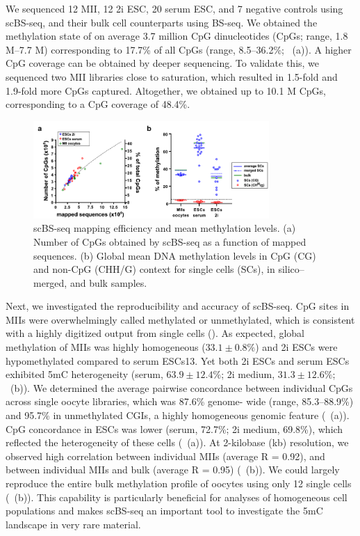 We sequenced 12 MII, 12 2i ESC, 20 serum ESC, and 7 negative controls using scBS-seq, and their bulk cell counterparts using BS-seq. We obtained the methylation state of on average 3.7 million CpG dinucleotides (CpGs; range, 1.8 M–7.7 M) corresponding to 17.7\% of all CpGs (range, 8.5–36.2\%; ~(a)). A higher CpG coverage can be obtained by deeper sequencing. To validate this, we sequenced two MII libraries close to saturation, which resulted in 1.5-fold and 1.9-fold more CpGs captured. Altogether, we obtained up to 10.1 M CpGs, corresponding to a CpG coverage of 48.4\%.

\begin{figure}[htbp!]
\centering
\includegraphics[width=0.8\textwidth]{qc}
\caption[scBS-seq mapping efficiency and mean methylation levels.]{scBS-seq mapping efficiency and mean methylation levels. (a) Number of CpGs obtained by scBS-seq as a function of mapped sequences. (b) Global mean DNA methylation levels in CpG (CG) and non-CpG (CHH/G) context for single cells (SCs), in silico–merged, and bulk samples. }
\label{fig:bs_qc}
\end{figure}

Next, we investigated the reproducibility and accuracy of scBS-seq. CpG sites in MIIs were overwhelmingly called methylated or unmethylated, which is consistent with a highly digitized output from single cells (). As expected, global methylation of MIIs was highly homogeneous ($33.1 \pm 0.8\%$) and 2i ESCs were hypomethylated compared to serum ESCs13. Yet both 2i ESCs and serum ESCs exhibited 5mC heterogeneity (serum, $63.9 \pm 12.4\%$; 2i medium, $31.3 \pm 12.6\%$; ~(b)). We determined the average pairwise concordance between individual CpGs across single oocyte libraries, which was 87.6\% genome- wide (range, 85.3–88.9\%) and 95.7\% in unmethylated CGIs, a highly homogeneous genomic feature (~(a)). CpG concordance in ESCs was lower (serum, 72.7\%; 2i medium, 69.8\%), which reflected the heterogeneity of these cells (~(a)). At 2-kilobase (kb) resolution, we observed high correlation between individual MIIs (average R = 0.92), and between individual MIIs and bulk (average R = 0.95) (~(b)). We could largely reproduce the entire bulk methylation profile of oocytes using only 12 single cells (~(b)). This capability is particularly beneficial for analyses of homogeneous cell populations and makes scBS-seq an important tool to investigate the 5mC landscape in very rare material.

